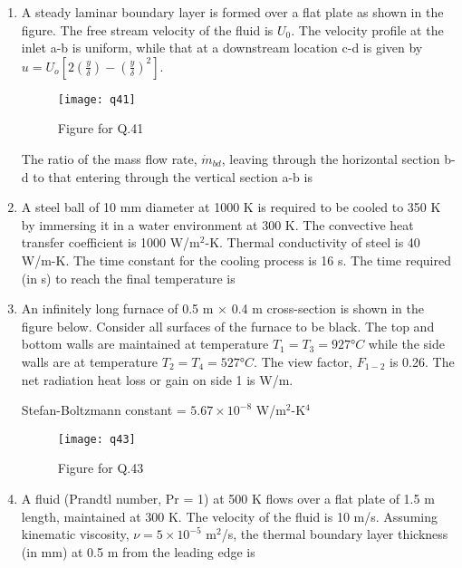 \documentclass[journal,11pt,onecolumn]{IEEEtran}
\begin{document}
\begin{enumerate}[resume]
    \item A steady laminar boundary layer is formed over a flat plate as shown in the figure. The free stream velocity of the fluid is $U_0$. The velocity profile at the inlet a-b is uniform, while that at a downstream location c-d is given by $u = U_o \left[ 2(\frac{y}{\delta}) - (\frac{y}{\delta})^2 \right] $.

          \begin{figure}[H]
              \centering
              \texttt{[image: q41]}
              \caption{Figure for Q.41}
              \label{q41}
          \end{figure}

          The ratio of the mass flow rate, $\dot{m}_{bd}$, leaving through the horizontal section b-d to that entering through the vertical section a-b is \underline{\hspace{2cm}}

    \item A steel ball of 10 mm diameter at 1000 K is required to be cooled to 350 K by immersing it in a water environment at 300 K. The convective heat transfer coefficient is 1000 W/m$^2$-K. Thermal conductivity of steel is 40 W/m-K. The time constant for the cooling process is 16 s. The time required (in s) to reach the final temperature is \underline{\hspace{2cm}}

    \item An infinitely long furnace of 0.5 m × 0.4 m cross-section is shown in the figure below. Consider all surfaces of the furnace to be black. The top and bottom walls are maintained at temperature $T_1 = T_3 = 927°C$ while the side walls are at temperature $T_2 = T_4 = 527°C$. The view factor, $F_{1-2}$ is 0.26. The net radiation heat loss or gain on side 1 is \underline{\hspace{2cm}} W/m.

          Stefan-Boltzmann constant = $5.67 \times 10^{-8}$ W/m$^2$-K$^4$

          \begin{figure}[H]
              \centering
              \texttt{[image: q43]}
              \caption{Figure for Q.43}
              \label{q43}
          \end{figure}

    \item A fluid (Prandtl number, Pr = 1) at 500 K flows over a flat plate of 1.5 m length, maintained at 300 K. The velocity of the fluid is 10 m/s. Assuming kinematic viscosity, $\nu = 5 \times 10^{-5}$ m$^2$/s, the thermal boundary layer thickness (in mm) at 0.5 m from the leading edge is \underline{\hspace{2cm}}


\end{enumerate}
\end{document}
